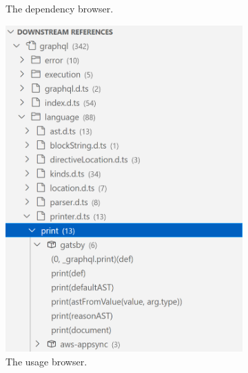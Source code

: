 \begin{figure}
\begin{subfigure}{.32\linewidth}
		\caption[LoF entry]{The dependency browser.}
		\label{fig:implementation/presentation/screenshot/dependency_browser}
	\end{subfigure}
	\hfill
	\begin{subfigure}{.32\linewidth}
		\includegraphics[width=\linewidth]{sections/4_implementation/extension/references.png}
		\caption[LoF entry]{The usage browser.}
		\label{fig:implementation/presentation/screenshot/usage_browser}
	\end{subfigure}
	\hfill
	\begin{subfigure}{.32\linewidth}

\end{subfigure}
\end{figure}
